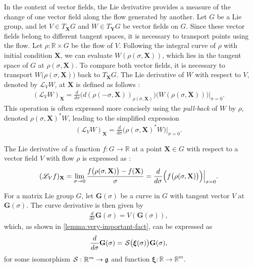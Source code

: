 In the context of vector fields, the Lie derivative provides a measure of the change of one vector field along the flow generated by another. Let $G$ be a Lie group, and let $V\in T_\mathbf{X}G$ and $W\in T_\mathbf{Y}G$ be vector fields on $G$. Since these vector fields belong to different tangent spaces, it is necessary to transport points using the flow. Let $\rho:\mathbb{R}\times G$ be the flow of $V$. Following the integral curve of $\rho$ with initial condition $\mathbf{X}$, we can evaluate $W(\rho(\sigma, \mathbf{X}))$, which lies in the tangent space of $G$ at $\rho(\sigma, \mathbf{X})$. To compare both vector fields, it is necessary to transport $W\bigl(\rho(\sigma, \mathbf{X})\bigr)$ back to $T_\mathbf{X}G$. The Lie derivative of $W$ with respect to $V$, denoted by $\mathscr{L}_V W$, at $\mathbf{X}$ is defined as follows \citep[p. 316]{Gallier2020}:
\begin{align}
    (\mathscr{L}_V W)_\mathbf{X}=\frac{d}{d\sigma}\bigl(d(\rho(-\sigma, \mathbf{X}))_{\rho(\sigma, \mathbf{X})}\bigr)\bigl(W(\rho(\sigma, \mathbf{X}))\bigr)\bigr|_{\sigma=0}.
\end{align}
This operation is often expressed more concisely using the \emph{pull-back} of $W$ by $\rho$, denoted $\rho(\sigma, \mathbf{X})^*W$, leading to the simplified expression \citep[p. 317]{Gallier2020}
\begin{align}
    (\mathscr{L}_V W)_\mathbf{X} = \frac{d}{d\sigma}\bigl(\rho(\sigma, \mathbf{X})^*W\bigr)\bigr|_{\sigma=0}.
\end{align}

The Lie derivative of a function $f:G\to \mathbb{R}$ at a point $\mathbf{X}\in G$ with respect to a vector field $V$ with flow $\rho$ is expressed as \citep[p. 121]{Lang2012}:
\begin{align}
    (\mathscr{L}_V f)_\mathbf{X} = \lim_{\sigma \to 0 }\frac{f\bigl(\rho(\sigma, \mathbf{X})\bigr) - f(\mathbf{X})}{\sigma} = \frac{d}{d\sigma}\Bigl(f\bigl(\rho(\sigma, \mathbf{X})\bigr)\Bigr)\Bigr|_{\sigma=0}.
\end{align}

For a matrix Lie group $G$, let $\mathbf{G}(\sigma)$ be a curve in $G$ with tangent vector $V$ at $\mathbf{G}(\sigma)$. The curve derivative is then given by
\begin{align}
    \frac{d}{d\sigma}\mathbf{G}(\sigma) = V(\mathbf{G}(\sigma)),
\end{align}
which, as shown in \cref{lemma:very-important-fact}, can be expressed as
\begin{align}
    \frac{d}{d\sigma}\mathbf{G}(\sigma) = \SL\bigl(\boldsymbol{\xi}(\sigma)\bigr)\mathbf{G}(\sigma),
\end{align}
for some isomorphism $\SL:\mathbb{R}^m\to \mathfrak{g}$ and function $\boldsymbol{\xi}:\mathbb{R}\to\mathbb{R}^m$.

